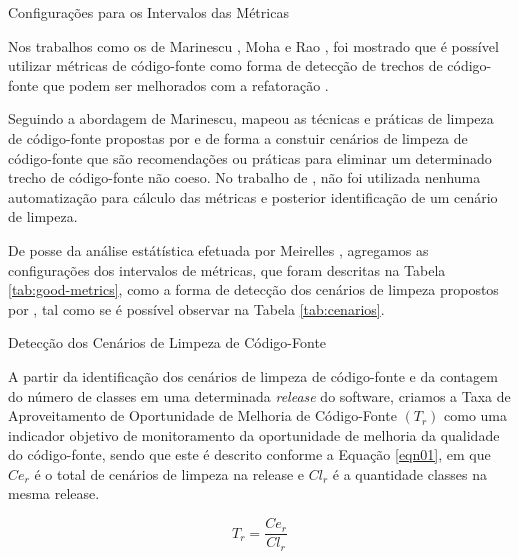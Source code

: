 	\begin{table}[!ht]
	\caption{Configurações para os Intervalos das Métricas}
	\addtolength{\belowcaptionskip}{2pt}
	\begin{center}
		
	\label{tab:good-metrics}
	\end{center}
	\end{table}
	\FloatBarrier



Nos trabalhos como os de Marinescu \cite{marinescu2005measurement}, Moha \cite{moha2010decor} e Rao \cite{rao2007detecting}, foi mostrado que é possível utilizar métricas de código-fonte como forma de detecção de trechos de código-fonte que podem ser melhorados com a refatoração \cite{fowler1999refactoring}.


Seguindo a abordagem de Marinescu, \cite{Machini2010} mapeou as técnicas e práticas de limpeza de código-fonte propostas por \cite{Martin2008} e \cite{beck2007implementation} de forma a constuir cenários de limpeza de código-fonte que são recomendações ou práticas para eliminar um determinado trecho de código-fonte não coeso. No trabalho de \cite{Machini2010}, não foi utilizada nenhuma automatização para cálculo das métricas e posterior identificação de um cenário de limpeza.

De posse da análise estátística efetuada por Meirelles \cite{Meirelles2013}, agregamos as configurações dos intervalos de métricas, que foram descritas na Tabela \ref{tab:good-metrics}, como a forma de detecção dos cenários de limpeza propostos por \cite{Machini2010}, tal como se é possível observar na Tabela \ref{tab:cenarios}.
	
	\begin{table}[ht]
	\centering
	\caption{Detecção dos Cenários de Limpeza de Código-Fonte}
	\addtolength{\belowcaptionskip}{6pt}
		
	\label{tab:cenarios}
	\end{table}
	\FloatBarrier


A partir da identificação dos cenários de limpeza de código-fonte e da contagem do número de classes em uma determinada \textit{release} do software, criamos a Taxa de Aproveitamento de Oportunidade de Melhoria de Código-Fonte $(T_r)$ como uma indicador objetivo de monitoramento da oportunidade de melhoria da qualidade do código-fonte, sendo que este é descrito conforme a Equação \ref{eqn01}, em que $ Ce_r $ é o total de cenários de limpeza na release e $ Cl_r $ é a quantidade classes na mesma release.

\begin{equation}
\label{eqn01}
T_r =   \frac{{{Ce_r}}}{{Cl_r}}
\end{equation}


